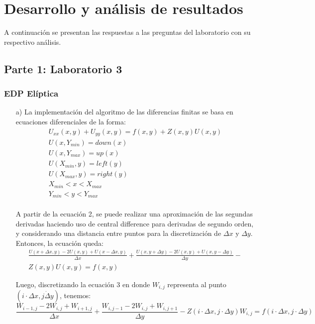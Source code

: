\documentclass[letterpaper]{article}
\newcommand{\5}
{
\\[.5cm]
}
\begin{document}
\section{Desarrollo y análisis de resultados}
A continuación se presentan las respuestas a las preguntas del laboratorio con su respectivo análisis.
\subsection{Parte 1: Laboratorio 3}
\subsubsection{EDP Elíptica}
\begin{itemize}
	\item[a)] La implementación del algoritmo de las diferencias finitas se basa en ecuaciones diferenciales de la forma:
    \begin{equation}
    \begin{split}
    	U_{xx}(x, y) + U_{yy}(x, y) = f(x, y) + Z(x, y) U(x, y) \\
        U(x, Y_{min}) = down(x) \\
        U(x, Y_{max}) = up(x) \\
        U(X_{min}, y) = left(y) \\
        U(X_{max}, y) = right(y) \\
        X_{min} < x < X_{max} \\
        Y_{min} < y < Y_{max} \\
    \end{split}
	\end{equation}
    
    A partir de la ecuación 2, se puede realizar una aproximación de las segundas derivadas haciendo uso de central difference para derivadas de segundo orden, y considerando una distancia entre puntos para la discretización de $\Delta x$ y $\Delta y$. Entonces, la ecuación queda:
    \begin{equation}
    \begin{split}
    \frac{U(x + \Delta x, y)-2U(x, y) + U(x - \Delta x, y)}{\Delta x} + \frac{U(x, y + \Delta y ) - 2U(x, y) + U(x, y - \Delta y)}{\Delta y} - \\Z(x, y) U(x,y) = f(x, y)
    \end{split}
    \end{equation}
    
    Luego, discretizando la ecuación 3 en donde $W_{i,j}$ representa al punto $(i \cdot \Delta x, j \dot \Delta y)$, tenemos:
    \begin{equation}
    	\frac{W_{i-1,j} - 2W_{i, j} + W_{i+1, j}}{\Delta x} + \frac{W_{i, j-1} - 2W_{i, j} + W_{i, j+1}}{\Delta y} - Z(i \cdot \Delta x, j \cdot \Delta y)W_{i, j} = f(i \cdot \Delta x, j \cdot \Delta y)
    \end{equation}
    

\end{itemize}
\end{document}
